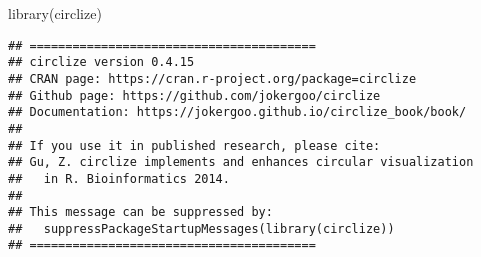 \documentclass[
]{article}
\newenvironment{Shaded}{\begin{snugshade}}{\end{snugshade}}
\newcommand{\AttributeTok}[1]{\textcolor[rgb]{0.77,0.63,0.00}{#1}}
\newcommand{\ConstantTok}[1]{\textcolor[rgb]{0.00,0.00,0.00}{#1}}
\newcommand{\DecValTok}[1]{\textcolor[rgb]{0.00,0.00,0.81}{#1}}
\newcommand{\FloatTok}[1]{\textcolor[rgb]{0.00,0.00,0.81}{#1}}
\newcommand{\FunctionTok}[1]{\textcolor[rgb]{0.00,0.00,0.00}{#1}}
\newcommand{\NormalTok}[1]{#1}
\newcommand{\OtherTok}[1]{\textcolor[rgb]{0.56,0.35,0.01}{#1}}
\newcommand{\SpecialCharTok}[1]{\textcolor[rgb]{0.00,0.00,0.00}{#1}}
\newcommand{\StringTok}[1]{\textcolor[rgb]{0.31,0.60,0.02}{#1}}
\begin{document}
\begin{Shaded}
\begin{Highlighting}[]
\FunctionTok{library}\NormalTok{(circlize)}
\end{Highlighting}
\end{Shaded}

\begin{verbatim}
## ========================================
## circlize version 0.4.15
## CRAN page: https://cran.r-project.org/package=circlize
## Github page: https://github.com/jokergoo/circlize
## Documentation: https://jokergoo.github.io/circlize_book/book/
## 
## If you use it in published research, please cite:
## Gu, Z. circlize implements and enhances circular visualization
##   in R. Bioinformatics 2014.
## 
## This message can be suppressed by:
##   suppressPackageStartupMessages(library(circlize))
## ========================================
\end{verbatim}

\begin{Shaded}
\end{Shaded}
\end{document}
